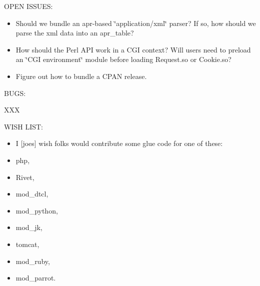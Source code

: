 OPEN ISSUES:

\begin{itemize}
\item Should we bundle an apr-based \char`\"{}application/xml\char`\"{} parser? If so, how should we parse the xml data into an apr\_\-table?\end{itemize}


\begin{itemize}
\item How should the Perl API work in a CGI context? Will users need to preload an \char`\"{}CGI environment\char`\"{} module before loading Request.so or Cookie.so?\end{itemize}


\begin{itemize}
\item Figure out how to bundle a CPAN release.\end{itemize}


BUGS:

XXX

WISH LIST:

\begin{itemize}
\item I [joes] wish folks would contribute some glue code for one of these:\end{itemize}


\begin{itemize}
\item php,\item Rivet,\item mod\_\-dtcl,\item mod\_\-python,\item mod\_\-jk,\item tomcat,\item mod\_\-ruby,\item mod\_\-parrot.\end{itemize}
